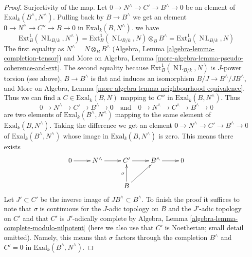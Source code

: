 \documentclass[10pt,a4paper]{amsart}
\theoremstyle{plain}
\theoremstyle{definition}
\theoremstyle{remark}
\numberwithin{equation}{subsection}
\def\NL{\mathop{N\!L}\nolimits}
\begin{document}
\begin{proof}
\medskip\noindent
Surjectivity of the map. Let $0 \to N^\wedge \to C' \to B^\wedge \to 0$
be an element of $\text{Exal}_k(B^\wedge, N^\wedge)$.
Pulling back by $B \to B^\wedge$ we get an element
$0 \to N^\wedge \to C'' \to B \to 0$ in
$\text{Exal}_k(B, N^\wedge)$.
we have
$$
\text{Ext}^1_B(\NL_{B/k}, N^\wedge) =
\text{Ext}^1_B(\NL_{B/k}, N) \otimes_B B^\wedge =
\text{Ext}^1_B(\NL_{B/k}, N)
$$
The first equality as $N^\wedge = N \otimes_B B^\wedge$
(Algebra, Lemma \ref{algebra-lemma-completion-tensor})
and
More on Algebra, Lemma \ref{more-algebra-lemma-pseudo-coherence-and-ext}.
The second equality because $\text{Ext}^1_B(\NL_{B/k}, N)$
is $J$-power torsion (see above), $B \to B^\wedge$ is flat and induces
an isomorphism $B/J \to B^\wedge/JB^\wedge$, and
More on Algebra, Lemma \ref{more-algebra-lemma-neighbourhood-equivalence}.
Thus we can find a $C \in \text{Exal}_k(B, N)$ mapping to $C''$ in
$\text{Exal}_k(B, N^\wedge)$.
Thus
$$
0 \to N^\wedge \to C' \to B^\wedge \to 0
\quad\text{and}\quad
0 \to N^\wedge \to C^\wedge \to B^\wedge \to 0
$$
are two elements of $\text{Exal}_k(B^\wedge, N^\wedge)$
mapping to the same element of $\text{Exal}_k(B, N^\wedge)$.
Taking the difference we get an element
$0 \to N^\wedge \to C' \to B^\wedge \to 0$ of
$\text{Exal}_k(B^\wedge, N^\wedge)$
whose image in $\text{Exal}_k(B, N^\wedge)$ is zero.
This means there exists
$$
\xymatrix{
0 \ar[r] &
N^\wedge \ar[r] &
C' \ar[r] &
B^\wedge \ar[r] & 0 \\
& & B \ar[u]^\sigma \ar[ru]
}
$$
Let $J' \subset C'$ be the inverse image of $JB^\wedge \subset B^\wedge$.
To finish the proof it suffices to note that
$\sigma$ is continuous for the $J$-adic topology on $B$
and the $J'$-adic topology on $C'$ and that $C'$ is $J'$-adically complete by
Algebra, Lemma \ref{algebra-lemma-complete-modulo-nilpotent}
(here we also use that $C'$ is Noetherian; small detail omitted).
Namely, this means that $\sigma$ factors through the
completion $B^\wedge$ and $C' = 0$ in $\text{Exal}_k(B^\wedge, N^\wedge)$.
\end{proof}
\end{document}
